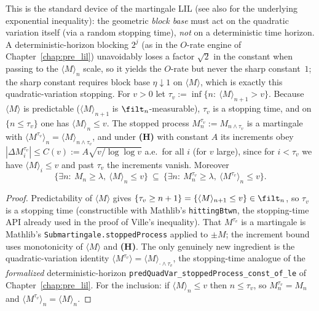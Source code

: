 \begin{lemma}\label{lem:llil_qv_stop}
This is the standard device of the martingale LIL \cite{Stout1970,HallHeyde1980} (see also
\cite{Freedman1975} for the underlying exponential inequality): the geometric \emph{block base}
must act on the quadratic variation itself (via a random stopping time), \emph{not} on a
deterministic time horizon. A deterministic-horizon blocking $2^j$ (as in the $O$-rate engine of
Chapter~\ref{chap:pre_lil}) unavoidably loses a factor $\sqrt2$ in the constant when passing to the
$\langle M\rangle_n$ scale, so it yields the $O$-rate but never the sharp constant~$1$; the
sharp constant requires block base $\eta\downarrow1$ on $\langle M\rangle$, which is exactly this
quadratic-variation stopping.
For $v>0$ let $\tau_v:=\inf\{n:\ \langle M\rangle_{n+1}>v\}$. Because $\langle M\rangle$
is predictable ($\langle M\rangle_{n+1}$ is $\filt_n$-measurable), $\tau_v$ is a
stopping time, and on $\{n\le\tau_v\}$ one has $\langle M\rangle_n\le v$. The stopped
process $M^{\tau_v}_n:=M_{n\wedge\tau_v}$ is a martingale with
$\langle M^{\tau_v}\rangle_n=\langle M\rangle_{n\wedge\tau_v}$, and under \textbf{(H)}
with constant $A$ its increments obey $|\Delta M^{\tau_v}_i|\le C(v):=A\sqrt{v/\log\log v}$
a.e.\ for all $i$ (for $v$ large), since for $i<\tau_v$ we have $\langle M\rangle_i\le v$
and past $\tau_v$ the increments vanish. Moreover
\[
  \{\exists n:\ M_n\ge\lambda,\ \langle M\rangle_n\le v\}\ \subseteq\
  \{\exists n:\ M^{\tau_v}_n\ge\lambda,\ \langle M^{\tau_v}\rangle_n\le v\}.
\]
\end{lemma}
\begin{proof}
Predictability of $\langle M\rangle$ gives $\{\tau_v\ge n+1\}=\{\langle M\rangle_{n+1}
\le v\}\in\filt_n$, so $\tau_v$ is a stopping time (constructible with Mathlib's
\texttt{hittingBtwn}, the stopping-time API already used in the proof of Ville's
inequality). That $M^{\tau_v}$ is a martingale is Mathlib's
\texttt{Submartingale.stoppedProcess} applied to $\pm M$; the increment bound uses
monotonicity of $\langle M\rangle$ and \textbf{(H)}. The only genuinely new ingredient is
the quadratic-variation identity $\langle M^{\tau_v}\rangle=\langle M\rangle_{\cdot\wedge
\tau_v}$, the stopping-time analogue of the \emph{formalized} deterministic-horizon
\texttt{predQuadVar\_stoppedProcess\_const\_of\_le} of Chapter~\ref{chap:pre_lil}. For the inclusion: if
$\langle M\rangle_n\le v$ then $n\le\tau_v$, so $M^{\tau_v}_n=M_n$ and
$\langle M^{\tau_v}\rangle_n=\langle M\rangle_n$.
\end{proof}

